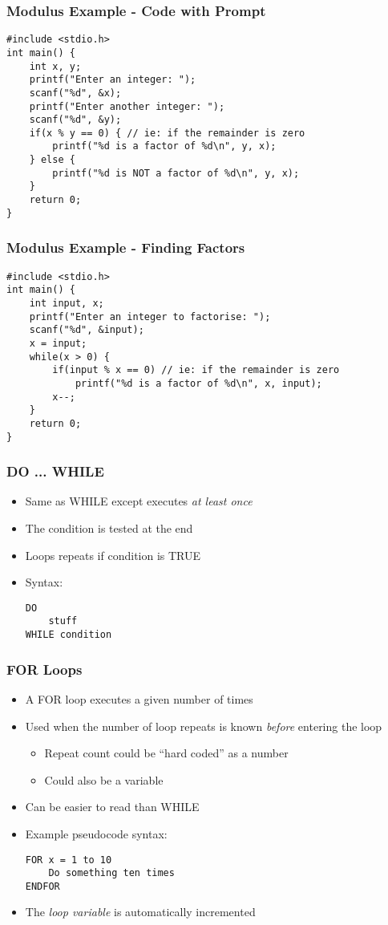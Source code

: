\documentclass[14pt]{beamer}
\begin{document}
\begin{frame}[fragile]
\frametitle{Modulus Example - Code with Prompt}
\begin{lstlisting}[style=CStyle,caption=\texttt{factorTest.c}]
#include <stdio.h>
int main() {
	int x, y;
	printf("Enter an integer: ");
	scanf("%d", &x);
	printf("Enter another integer: ");
	scanf("%d", &y);
	if(x % y == 0) { // ie: if the remainder is zero
		printf("%d is a factor of %d\n", y, x);
	} else {
		printf("%d is NOT a factor of %d\n", y, x);
	}
	return 0;
}
\end{lstlisting}
\end{frame}

\begin{frame}[fragile]
\frametitle{Modulus Example - Finding Factors}

\begin{lstlisting}[style=CStyle,basicstyle=\ttfamily\footnotesize,caption=\texttt{factors.c}]
#include <stdio.h>
int main() {
	int input, x;
	printf("Enter an integer to factorise: ");
	scanf("%d", &input);
	x = input;
	while(x > 0) {
		if(input % x == 0) // ie: if the remainder is zero
			printf("%d is a factor of %d\n", x, input);
		x--;
	}
	return 0;
}
\end{lstlisting}
\end{frame}

\begin{frame}[fragile]
\frametitle{DO ... WHILE}
\begin{itemize}
\item Same as WHILE except executes \textit{at least once}
\item The condition is tested at the end
\item Loops repeats if condition is TRUE
\item Syntax:
\begin{lstlisting}[style=pseudo]
DO
	stuff
WHILE condition
\end{lstlisting}
\end{itemize}

\end{frame}

\begin{frame}[fragile]
\frametitle{FOR Loops}
\begin{itemize}
\item A FOR loop executes a given number of times
\item Used when the number of loop repeats is known \textit{before} entering the loop
	\begin{itemize}
		\item Repeat count could be ``hard coded'' as a number
		\item Could also be a variable
	\end{itemize}
\item Can be easier to read than WHILE
\item Example pseudocode syntax:
\begin{lstlisting}[style=pseudo]
FOR x = 1 to 10
	Do something ten times
ENDFOR
\end{lstlisting}
\item The \textit{loop variable} is automatically incremented
\end{itemize}
\end{frame}
\end{document}
